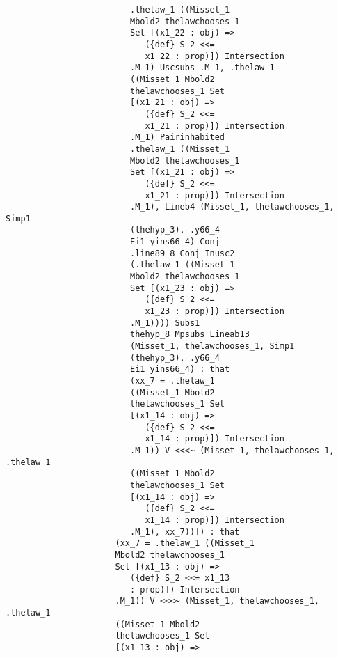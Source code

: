\documentclass{article}
\begin{document}
\begin{verbatim}
                         .thelaw_1 ((Misset_1 
                         Mbold2 thelawchooses_1 
                         Set [(x1_22 : obj) => 
                            ({def} S_2 <<= 
                            x1_22 : prop)]) Intersection 
                         .M_1) Uscsubs .M_1, .thelaw_1 
                         ((Misset_1 Mbold2 
                         thelawchooses_1 Set 
                         [(x1_21 : obj) => 
                            ({def} S_2 <<= 
                            x1_21 : prop)]) Intersection 
                         .M_1) Pairinhabited 
                         .thelaw_1 ((Misset_1 
                         Mbold2 thelawchooses_1 
                         Set [(x1_21 : obj) => 
                            ({def} S_2 <<= 
                            x1_21 : prop)]) Intersection 
                         .M_1), Lineb4 (Misset_1, thelawchooses_1, Simp1 
                         (thehyp_3), .y66_4 
                         Ei1 yins66_4) Conj 
                         .line89_8 Conj Inusc2 
                         (.thelaw_1 ((Misset_1 
                         Mbold2 thelawchooses_1 
                         Set [(x1_23 : obj) => 
                            ({def} S_2 <<= 
                            x1_23 : prop)]) Intersection 
                         .M_1)))) Subs1 
                         thehyp_8 Mpsubs Lineab13 
                         (Misset_1, thelawchooses_1, Simp1 
                         (thehyp_3), .y66_4 
                         Ei1 yins66_4) : that 
                         (xx_7 = .thelaw_1 
                         ((Misset_1 Mbold2 
                         thelawchooses_1 Set 
                         [(x1_14 : obj) => 
                            ({def} S_2 <<= 
                            x1_14 : prop)]) Intersection 
                         .M_1)) V <<<~ (Misset_1, thelawchooses_1, .thelaw_1 
                         ((Misset_1 Mbold2 
                         thelawchooses_1 Set 
                         [(x1_14 : obj) => 
                            ({def} S_2 <<= 
                            x1_14 : prop)]) Intersection 
                         .M_1), xx_7))]) : that 
                      (xx_7 = .thelaw_1 ((Misset_1 
                      Mbold2 thelawchooses_1 
                      Set [(x1_13 : obj) => 
                         ({def} S_2 <<= x1_13 
                         : prop)]) Intersection 
                      .M_1)) V <<<~ (Misset_1, thelawchooses_1, .thelaw_1 
                      ((Misset_1 Mbold2 
                      thelawchooses_1 Set 
                      [(x1_13 : obj) => 

\end{verbatim}
\end{document}
